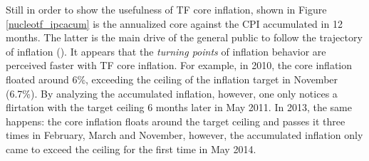 \documentclass[10pt]{article}
\begin{document}

Still in order to show the usefulness of TF core inflation, shown in Figure \ref{nucleotf_ipcacum} is the annualized core against the CPI accumulated in 12 months. The latter is the main drive of the general public to follow the trajectory of inflation (\cite{ferreira2016, silvia}). It appears that the \textit{turning points} of inflation behavior are perceived faster with TF core inflation. For example, in 2010, the core inflation floated around 6\%, exceeding the ceiling of the inflation target in November (6.7\%). By analyzing the accumulated inflation, however, one only notices a flirtation with the target ceiling 6 months later in May 2011. In 2013, the same happens: the core inflation floats around the target ceiling and  passes it three times in February, March and November, however, the accumulated inflation only came to exceed the ceiling for the first time in May 2014.

\end{document}

